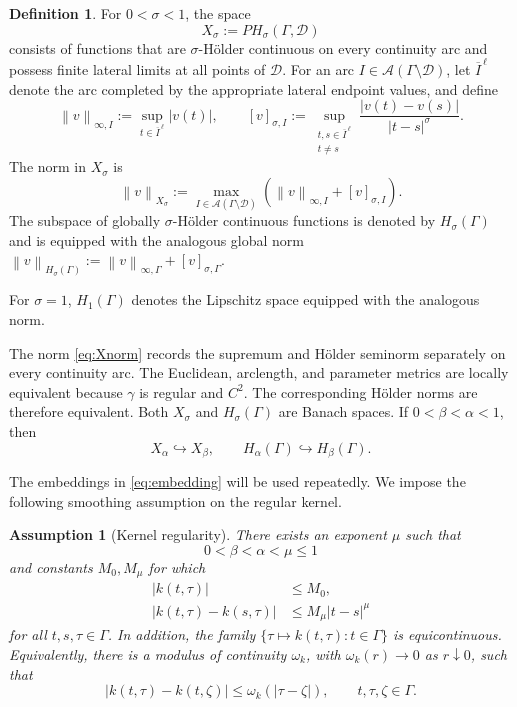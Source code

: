 \documentclass[11pt,a4paper]{amsart}
\theoremstyle{plain}
\newtheorem{assumption}[theorem]{Assumption}
\theoremstyle{definition}
\newtheorem{definition}[theorem]{Definition}
\theoremstyle{remark}
\newcommand{\Ga}{\Gamma}
\newcommand{\D}{\mathcal D}
\newcommand{\A}{\mathcal A}
\newcommand{\norm}[1]{\left\|#1\right\|}
\begin{document}
\begin{definition}\label{def:Xsigma}
For $0<\sigma<1$, the space
\[
        X_\sigma:=PH_\sigma(\Ga,\D)
\]
consists of functions that are $\sigma$-H\"older continuous on every continuity arc and possess finite lateral limits at all points of $\D$.  For an arc $I\in\A(\Ga\setminus\D)$, let $\overline I^{\,\ell}$ denote the arc completed by the appropriate lateral endpoint values, and define
\[
        \norm{v}_{\infty,I}
        :=\sup_{t\in\overline I^{\,\ell}}|v(t)|,
        \qquad
        [v]_{\sigma,I}
        :=\sup_{\substack{t,s\in\overline I^{\,\ell}\\t\ne s}}
        \frac{|v(t)-v(s)|}{|t-s|^\sigma}.
\]
The norm in $X_\sigma$ is
\begin{equation}\label{eq:Xnorm}
        \norm{v}_{X_\sigma}
        :=\max_{I\in\A(\Ga\setminus\D)}
        \left(\norm{v}_{\infty,I}+[v]_{\sigma,I}\right).
\end{equation}
The subspace of globally $\sigma$-H\"older continuous functions is denoted by $H_\sigma(\Ga)$ and is equipped with the analogous global norm
$
        \norm{v}_{H_\sigma(\Ga)}
        :=\norm{v}_{\infty,\Ga}+[v]_{\sigma,\Ga}.
$
\end{definition}

For $\sigma=1$, $H_1(\Ga)$ denotes the Lipschitz space equipped with the analogous norm.

The norm \eqref{eq:Xnorm} records the supremum and H\"older seminorm separately on every continuity arc.  The Euclidean, arclength, and parameter metrics are locally equivalent because $\gamma$ is regular and $C^2$.  The corresponding H\"older norms are therefore equivalent.  Both $X_\sigma$ and $H_\sigma(\Ga)$ are Banach spaces.  If $0<\beta<\alpha<1$, then
\begin{equation}\label{eq:embedding}
        X_\alpha\hookrightarrow X_\beta,
        \qquad H_\alpha(\Ga)\hookrightarrow H_\beta(\Ga).
\end{equation}

The embeddings in \eqref{eq:embedding} will be used repeatedly.  We impose the following smoothing assumption on the regular kernel.

\begin{assumption}[Kernel regularity]\label{ass:kernel}
There exists an exponent $\mu$ such that
\[
        0<\beta<\alpha<\mu\le1
\]
and constants $M_0,M_\mu$ for which
\begin{align}
        |k(t,\tau)|&\le M_0,\label{eq:kbound}\\
        |k(t,\tau)-k(s,\tau)|&\le M_\mu|t-s|^\mu\label{eq:kholder}
\end{align}
for all $t,s,\tau\in\Ga$.  In addition, the family $\{\tau\mapsto k(t,\tau):t\in\Ga\}$ is equicontinuous.  Equivalently, there is a modulus of continuity $\omega_k$, with $\omega_k(r)\to0$ as $r\downarrow0$, such that
\begin{equation}\label{eq:kuniformtau}
        |k(t,\tau)-k(t,\zeta)|
        \le \omega_k(|\tau-\zeta|),
        \qquad t,\tau,\zeta\in\Ga.
\end{equation}
\end{assumption}
\end{document}
